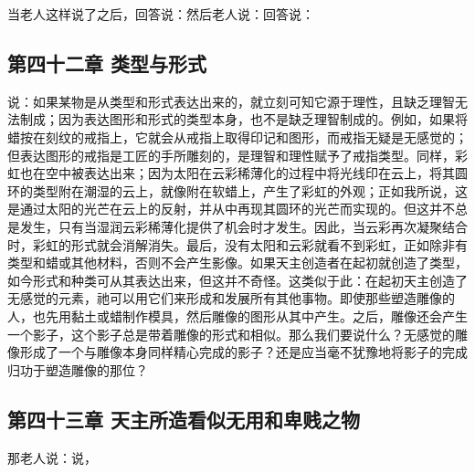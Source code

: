 当老人这样说了之后，回答说：然后老人说：回答说：\par


\subsection{第四十二章 类型与形式}

说：如果某物是从类型和形式表达出来的，就立刻可知它源于理性，且缺乏理智无法制成；因为表达图形和形式的类型本身，也不是缺乏理智制成的。例如，如果将蜡按在刻纹的戒指上，它就会从戒指上取得印记和图形，而戒指无疑是无感觉的；但表达图形的戒指是工匠的手所雕刻的，是理智和理性赋予了戒指类型。同样，彩虹也在空中被表达出来；因为太阳在云彩稀薄化的过程中将光线印在云上，将其圆环的类型附在潮湿的云上，就像附在软蜡上，产生了彩虹的外观；正如我所说，这是通过太阳的光芒在云上的反射，并从中再现其圆环的光芒而实现的。但这并不总是发生，只有当湿润云彩稀薄化提供了机会时才发生。因此，当云彩再次凝聚结合时，彩虹的形式就会消解消失。最后，没有太阳和云彩就看不到彩虹，正如除非有类型和蜡或其他材料，否则不会产生影像。如果天主创造者在起初就创造了类型，如今形式和种类可从其表达出来，但这并不奇怪。这类似于此：在起初天主创造了无感觉的元素，祂可以用它们来形成和发展所有其他事物。即使那些塑造雕像的人，也先用黏土或蜡制作模具，然后雕像的图形从其中产生。之后，雕像还会产生一个影子，这个影子总是带着雕像的形式和相似。那么我们要说什么？无感觉的雕像形成了一个与雕像本身同样精心完成的影子？还是应当毫不犹豫地将影子的完成归功于塑造雕像的那位？\par


\subsection{第四十三章 天主所造看似无用和卑贱之物}

那老人说：说，\par

